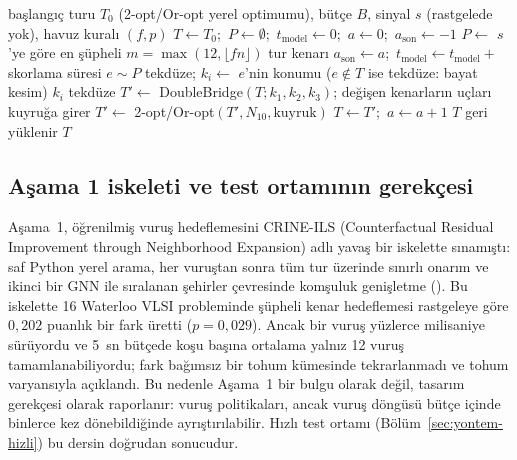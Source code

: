 \documentclass[pdflatex,sn-basic]{sn-jnl}
\begin{document}
\begin{algorithm}[!htbp]
\caption{Hedefli hızlı ILS (bir strateji, bir (problem, tohum) çifti)}\label{alg:ils}
\begin{algorithmic}[1]
\Require başlangıç turu $T_0$ (2-opt/Or-opt yerel optimumu), bütçe $B$, sinyal $s$ (rastgelede yok), havuz kuralı $(f,p)$
\State $T\gets T_0$;\ $P\gets\emptyset$;\ $t_{\mathrm{model}}\gets0$;\ $a\gets0$;\ $a_{\mathrm{son}}\gets-1$ 
    \State $P\gets$ $s$'ye göre en şüpheli $m=\max(12,\lfloor fn\rfloor)$ tur kenarı 
    \State $a_{\mathrm{son}}\gets a$;\ $t_{\mathrm{model}}\gets t_{\mathrm{model}}+{}$skorlama süresi
  \EndIf
        \State $e\sim P$ tekdüze; $k_i\gets$ $e$'nin konumu ($e\notin T$ ise tekdüze: bayat kesim)
      \Else
        \State $k_i$ tekdüze
      \EndIf
    \EndFor
    \State $T'\gets$ DoubleBridge$(T;k_1,k_2,k_3)$; değişen kenarların uçları kuyruğa girer
    \State $T'\gets$ 2-opt/Or-opt$(T',N_{10},\text{kuyruk})$ 
     \State $T\gets T'$;\ $a\gets a+1$ \Else \State $T$ geri yüklenir \EndIf
  \EndFor
\EndWhile
\State \Return $T$
\end{algorithmic}
\end{algorithm}

\subsection{Aşama 1 iskeleti ve test ortamının gerekçesi}\label{sec:yontem-crine}

Aşama~1, öğrenilmiş vuruş hedeflemesini CRINE-ILS (Counterfactual Residual Improvement through Neighborhood Expansion) adlı yavaş bir iskelette sınamıştı: saf Python
yerel arama, her vuruştan sonra tüm tur üzerinde sınırlı onarım ve ikinci bir GNN ile sıralanan
şehirler çevresinde komşuluk genişletme (). Bu iskelette 16 Waterloo VLSI
probleminde şüpheli kenar hedeflemesi rastgeleye göre $0{,}202$ puanlık bir fark üretti
($p=0{,}029$). Ancak bir vuruş yüzlerce milisaniye sürüyordu ve 5~sn bütçede koşu başına ortalama
yalnız 12 vuruş tamamlanabiliyordu; fark bağımsız bir tohum kümesinde tekrarlanmadı ve tohum
varyansıyla açıklandı. Bu nedenle Aşama~1 bir bulgu olarak değil, tasarım gerekçesi olarak
raporlanır: vuruş politikaları, ancak vuruş döngüsü bütçe içinde binlerce kez dönebildiğinde
ayrıştırılabilir. Hızlı test ortamı (Bölüm~\ref{sec:yontem-hizli}) bu dersin doğrudan sonucudur.
\end{document}
